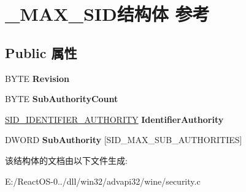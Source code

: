 \hypertarget{struct___m_a_x___s_i_d}{}\section{\+\_\+\+M\+A\+X\+\_\+\+S\+I\+D结构体 参考}
\label{struct___m_a_x___s_i_d}
\subsection*{Public 属性}
\begin{DoxyCompactItemize}
\item 
\mbox{\label{struct___m_a_x___s_i_d_aa5beed00d0a85da4cb1930fe8657590a}} 
B\+Y\+TE {\bfseries Revision}
\item 
\mbox{\label{struct___m_a_x___s_i_d_a8d1d655fab2fe7c074b5d02acffda25c}} 
B\+Y\+TE {\bfseries Sub\+Authority\+Count}
\item 
\mbox{\label{struct___m_a_x___s_i_d_a16c3f21ad14af83cce2a9d0e260a7fc2}} 
\hyperlink{struct___s_i_d___i_d_e_n_t_i_f_i_e_r___a_u_t_h_o_r_i_t_y}{S\+I\+D\+\_\+\+I\+D\+E\+N\+T\+I\+F\+I\+E\+R\+\_\+\+A\+U\+T\+H\+O\+R\+I\+TY} {\bfseries Identifier\+Authority}
\item 
\mbox{\label{struct___m_a_x___s_i_d_ae84109fa2408eea79e80372ce2379264}} 
D\+W\+O\+RD {\bfseries Sub\+Authority} \mbox{[}S\+I\+D\+\_\+\+M\+A\+X\+\_\+\+S\+U\+B\+\_\+\+A\+U\+T\+H\+O\+R\+I\+T\+I\+ES\mbox{]}
\end{DoxyCompactItemize}


该结构体的文档由以下文件生成\+:\begin{DoxyCompactItemize}
\item 
E\+:/\+React\+O\+S-\/0../dll/win32/advapi32/wine/security.\+c\end{DoxyCompactItemize}
